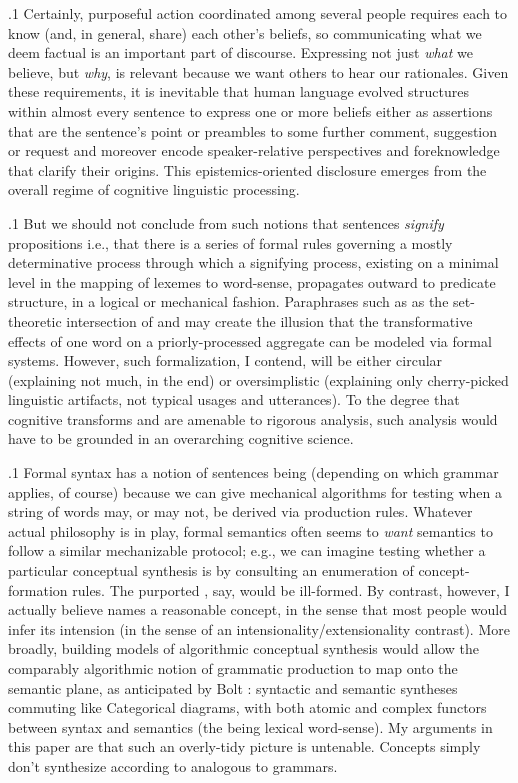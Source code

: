 \documentclass[11pt, twocolumn]{article}
\begin{document}
\p.1{%
Certainly, purposeful action coordinated among several people requires
each to know (and, in general, share) each other's beliefs,
so communicating what we deem factual is an important part of
discourse.  Expressing not just \textit{what} we believe, but \textit{why},
is relevant because we want others to hear our rationales.
Given these requirements, it is inevitable that human
language evolved structures within almost every sentence
to express one or more beliefs \mdash{} either as assertions that
are the sentence's point or preambles to some further
comment, suggestion or request \mdash{} and moreover
encode speaker-relative perspectives and foreknowledge that
clarify their origins.  This epistemics-oriented disclosure
emerges from the overall regime of cognitive linguistic
processing.
} %

\p.1{%
But we should not conclude from such notions that
sentences \textit{signify} propositions \mdash{} i.e., that there
is a series of formal rules governing a mostly
determinative process through which a signifying process,
existing on a minimal level in the mapping of lexemes
to word-sense, propagates outward to predicate
structure, in a logical or mechanical fashion.
Paraphrases such as  as the set-theoretic
intersection of  and  may
create the illusion that the transformative
effects of one word on a priorly-processed aggregate
can be modeled via formal systems.  However, such
formalization, I contend, will be either circular
(explaining not much, in the end) or oversimplistic
(explaining only cherry-picked linguistic artifacts,
not typical usages and utterances).  To the degree
that cognitive transforms and  are
amenable to rigorous analysis, such analysis
would have to be grounded in an overarching
cognitive science.
} %

\p.1{%
Formal syntax has a notion of sentences being 
(depending on which grammar applies, of course) because we can give
mechanical algorithms for testing when a string of words may, or may not,
be derived via production rules.  Whatever actual philosophy is in play,
formal semantics often seems to \textit{want} semantics to follow a
similar mechanizable protocol; e.g., we can imagine testing whether a
particular conceptual synthesis is  by
consulting an enumeration of concept-formation rules.  The purported
, say, would be ill-formed.  By contrast, however,
I actually believe  names a reasonable concept, in the
sense that most people would infer its intension (in the sense of an
intensionality/extensionality contrast).  More broadly, building
models of algorithmic conceptual synthesis would allow the comparably
algorithmic notion of grammatic production to map onto the semantic
plane, as anticipated by Bolt \etal{}: syntactic and semantic syntheses
commuting like Categorical diagrams, with both atomic and complex functors
between syntax and semantics (the  being lexical word-sense).
My arguments in this paper are that such an overly-tidy picture is
untenable.  Concepts simply don't synthesize according to
 analogous to  grammars.
} %
\end{document}
